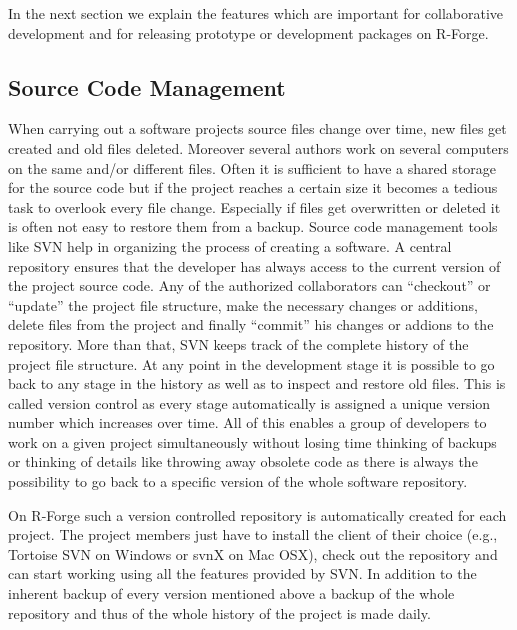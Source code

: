 In the next section we explain the features which are important for
collaborative development and for releasing prototype or development
packages on R-Forge.

\subsection{Source Code Management}

When carrying out a software projects source files change over time,
new files get created and old files deleted. Moreover several authors
work on several computers on the same and/or different files. Often it
is sufficient to have a shared storage for the source code but if the
project reaches a certain size it becomes a tedious task to overlook
every file change. Especially if files get overwritten or deleted it
is often not easy to restore them from a backup. Source
code management tools like SVN help in organizing the process of
creating a software. A central repository ensures that the developer
has always access to the current version of the project source
code. Any of the authorized collaborators can ``checkout'' or
``update'' the project
file structure, make the necessary changes or additions, delete
files from the project and finally ``commit'' his changes or addions
to the repository. More than
that, SVN keeps track of the complete history of the project file
structure. At any point in the development stage it is possible to go
back to any stage in the history as well as to inspect and restore old
files. This is called version control as every stage automatically is
assigned a unique version number which increases over time. 
All of this enables a group of developers to work on a given project
simultaneously without losing time thinking of backups or thinking of
details like throwing away obsolete code as there is always the possibility to 
go back to a specific version of the whole software repository.

On R-Forge such a version controlled repository is automatically
created for each project. The project members just have to install
the client of their choice (e.g., Tortoise SVN on Windows or svnX on
Mac OSX), check out the repository and can start working using all the
features provided by SVN. In addition to the inherent backup of every
version mentioned above a backup of the whole repository and thus of
the whole history of the project is made daily. 


